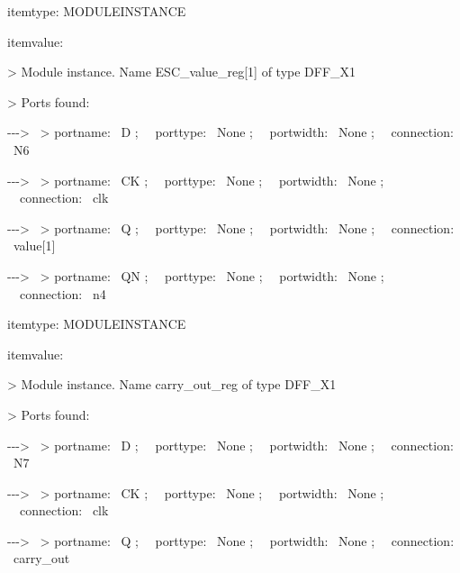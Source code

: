 \documentclass[a4paper]{article}
\begin{document}
\begin{center}
\begin{minipage}{5.98958in}
{\ttfamily\color[rgb]{0.0,0.0,0.039215688}
itemtype: MODULEINSTANCE}

{\ttfamily\color[rgb]{0.0,0.0,0.039215688}
itemvalue:}

{\ttfamily\color[rgb]{0.0,0.0,0.039215688}
{\textgreater} Module instance. Name ESC\_value\_reg[1] of type DFF\_X1}

{\ttfamily\color[rgb]{0.0,0.0,0.039215688}
{\textgreater} Ports found:}

{\ttfamily\color[rgb]{0.0,0.0,0.039215688}
{}-{}-{}-{\textgreater} \ {\textgreater} portname: \ D ; \ \ porttype:
\ None ; \ \ portwidth: \ None ; \ \ connection: \ N6}

{\ttfamily\color[rgb]{0.0,0.0,0.039215688}
{}-{}-{}-{\textgreater} \ {\textgreater} portname: \ CK ; \ \ porttype:
\ None ; \ \ portwidth: \ None ; \ \ connection: \ clk}

{\ttfamily\color[rgb]{0.0,0.0,0.039215688}
{}-{}-{}-{\textgreater} \ {\textgreater} portname: \ Q ; \ \ porttype:
\ None ; \ \ portwidth: \ None ; \ \ connection: \ value[1]}

{\ttfamily\color[rgb]{0.0,0.0,0.039215688}
{}-{}-{}-{\textgreater} \ {\textgreater} portname: \ QN ; \ \ porttype:
\ None ; \ \ portwidth: \ None ; \ \ connection: \ n4}


\bigskip

{\ttfamily\color[rgb]{0.0,0.0,0.039215688}
itemtype: MODULEINSTANCE}

{\ttfamily\color[rgb]{0.0,0.0,0.039215688}
itemvalue:}

{\ttfamily\color[rgb]{0.0,0.0,0.039215688}
{\textgreater} Module instance. Name carry\_out\_reg of type DFF\_X1}

{\ttfamily\color[rgb]{0.0,0.0,0.039215688}
{\textgreater} Ports found:}

{\ttfamily\color[rgb]{0.0,0.0,0.039215688}
{}-{}-{}-{\textgreater} \ {\textgreater} portname: \ D ; \ \ porttype:
\ None ; \ \ portwidth: \ None ; \ \ connection: \ N7}

{\ttfamily\color[rgb]{0.0,0.0,0.039215688}
{}-{}-{}-{\textgreater} \ {\textgreater} portname: \ CK ; \ \ porttype:
\ None ; \ \ portwidth: \ None ; \ \ connection: \ clk}

{\ttfamily\color[rgb]{0.0,0.0,0.039215688}
{}-{}-{}-{\textgreater} \ {\textgreater} portname: \ Q ; \ \ porttype:
\ None ; \ \ portwidth: \ None ; \ \ connection: \ carry\_out}



\end{minipage}
\end{center}
\end{document}
